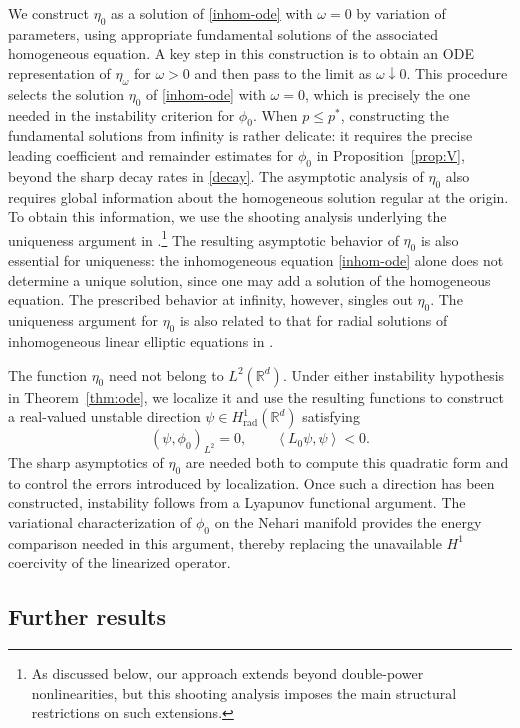 \documentclass[12pt, a4paper, reqno]{amsart}
\numberwithin{equation}{section}
\theoremstyle{definition}
\theoremstyle{remark}
\newcommand{\R}{\mathbb R}
\def\tbra[#1,#2]{{\left\langle #1,#2\right\rangle}}
\def\rbra[#1,#2]{{\left( #1,#2\right)}}
\newcommand{\rad}{\mathrm{rad}}
\begin{document}
We construct $\eta_0$ as a solution of \eqref{inhom-ode}
with $\omega=0$ by variation of parameters, using appropriate
fundamental solutions of the associated homogeneous equation.
A key step in this construction is to obtain an ODE representation
of $\eta_\omega$ for $\omega>0$ and then pass to the limit as
$\omega\downarrow0$.
This procedure selects the solution $\eta_0$ of \eqref{inhom-ode}
with $\omega=0$, which is precisely the one needed in the
instability criterion for $\phi_0$.
When $p\le p^*$, constructing the fundamental solutions
from infinity is rather delicate: it requires the precise
leading coefficient and remainder estimates for $\phi_0$
in Proposition~\ref{prop:V}, beyond the sharp decay rates in \eqref{decay}.
The asymptotic analysis of $\eta_0$ also requires global information
about the homogeneous solution regular at the origin.
To obtain this information, we use the shooting analysis
underlying the uniqueness argument in \cite{M93}.\footnote{
As discussed below, our approach extends beyond double-power
nonlinearities, but this shooting analysis imposes the main
structural restrictions on such extensions.}
The resulting asymptotic behavior of $\eta_0$ is also essential
for uniqueness: the inhomogeneous equation \eqref{inhom-ode}
alone does not determine a unique solution,
since one may add a solution of the homogeneous equation.
The prescribed behavior at infinity, however, singles out $\eta_0$.
The uniqueness argument for $\eta_0$ is also related to that
for radial solutions of inhomogeneous linear elliptic equations
in \cite{FMR06}.

The function $\eta_0$ need not belong to $L^2(\R^d)$. Under either
instability hypothesis in Theorem~\ref{thm:ode}, we localize it and
use the resulting functions to construct a real-valued
unstable direction $\psi\in H^1_{\rad}(\R^d)$ satisfying
\[
  \rbra[\psi,\phi_0]_{L^2}=0,
  \qquad \tbra[L_0\psi,\psi]<0.
\]
The sharp asymptotics of $\eta_0$ are needed both to compute this
quadratic form and to control the errors introduced by
localization. Once such a direction has been constructed,
instability follows from a Lyapunov functional argument. The
variational characterization of $\phi_0$ on the Nehari manifold
provides the energy comparison needed in this argument, thereby
replacing the unavailable $H^1$ coercivity of the linearized
operator.

\subsection{Further results}
\end{document}
